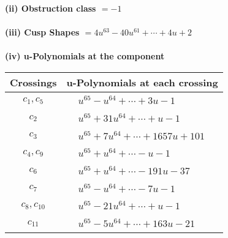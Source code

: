 \documentclass[1p]{elsarticle_modified}
\theoremstyle{definition}
\begin{document}
\flushleft \textbf{(ii) Obstruction class $= -1$}\\~\\
\flushleft \textbf{(iii) Cusp Shapes $= 4 u^{63}-40 u^{61}+\cdots+4 u+2$}\\~\\
\newpage\renewcommand{\arraystretch}{1}
\flushleft \textbf{(iv) u-Polynomials at the component}\newline \\
\begin{tabular}{m{50pt}|m{274pt}}
Crossings & \hspace{64pt}u-Polynomials at each crossing \\
\hline $$\begin{aligned}c_{1},c_{5}\end{aligned}$$&$\begin{aligned}
&u^{65}- u^{64}+\cdots+3 u-1
\end{aligned}$\\
\hline $$\begin{aligned}c_{2}\end{aligned}$$&$\begin{aligned}
&u^{65}+31 u^{64}+\cdots+u-1
\end{aligned}$\\
\hline $$\begin{aligned}c_{3}\end{aligned}$$&$\begin{aligned}
&u^{65}+7 u^{64}+\cdots+1657 u+101
\end{aligned}$\\
\hline $$\begin{aligned}c_{4},c_{9}\end{aligned}$$&$\begin{aligned}
&u^{65}+u^{64}+\cdots- u-1
\end{aligned}$\\
\hline $$\begin{aligned}c_{6}\end{aligned}$$&$\begin{aligned}
&u^{65}+u^{64}+\cdots-191 u-37
\end{aligned}$\\
\hline $$\begin{aligned}c_{7}\end{aligned}$$&$\begin{aligned}
&u^{65}- u^{64}+\cdots-7 u-1
\end{aligned}$\\
\hline $$\begin{aligned}c_{8},c_{10}\end{aligned}$$&$\begin{aligned}
&u^{65}-21 u^{64}+\cdots+u-1
\end{aligned}$\\
\hline $$\begin{aligned}c_{11}\end{aligned}$$&$\begin{aligned}
&u^{65}-5 u^{64}+\cdots+163 u-21
\end{aligned}$\\
\hline
\end{tabular}\\~\\
\end{document}
